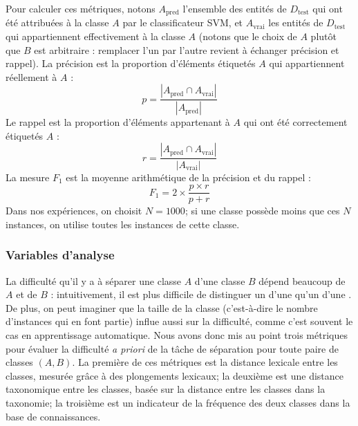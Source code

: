 Pour calculer ces métriques, notons $A_\textrm{pred}$ l'ensemble des entités de $D_\textrm{test}$ qui ont été attribuées à la classe $A$ par le classificateur SVM, et $A_\textrm{vrai}$ les entités de $D_\textrm{test}$ qui appartiennent effectivement à la classe $A$ (notons que le choix de $A$ plutôt que $B$ est arbitraire : remplacer l'un par l'autre revient à échanger précision et rappel).
La précision est la proportion d'éléments étiquetés $A$ qui appartiennent réellement à $A$ :
\begin{equation*}
    p = \frac{|A_\textrm{pred} \cap A_\textrm{vrai}|}{|A_\textrm{pred}|}
\end{equation*}
Le rappel est la proportion d'éléments appartenant à $A$ qui ont été correctement étiquetés $A$ :
\begin{equation*}
    r = \frac{|A_\textrm{pred} \cap A_\textrm{vrai}|}{|A_\textrm{vrai}|}
\end{equation*}
La mesure $F_1$ est la moyenne arithmétique de la précision et du rappel :
\begin{equation*}
    F_1 = 2 \times \frac{p \times r}{p + r}
\end{equation*}
Dans nos expériences, on choisit $N=1000$; si une classe possède moins que ces $N$ instances, on utilise toutes les instances de cette classe.



\subsubsection{Variables d'analyse}

La difficulté qu'il y a à séparer une classe $A$ d'une classe $B$ dépend beaucoup de $A$ et de $B$ : intuitivement, il est plus difficile de distinguer un  d'une  qu'un  d'une . De plus, on peut imaginer que la taille de la classe (c'est-à-dire le nombre d'instances qui en font partie) influe aussi sur la difficulté, comme c'est souvent le cas en apprentissage automatique. Nous avons donc mis au point trois métriques pour évaluer la difficulté \textit{a priori} de la tâche de séparation pour toute paire de classes $(A, B)$. La première de ces métriques est la distance lexicale entre les classes, mesurée grâce à des plongements lexicaux; la deuxième est une distance taxonomique entre les classes, basée sur la distance entre les classes dans la taxonomie; la troisième est un indicateur de la fréquence des deux classes dans la base de connaissances.

